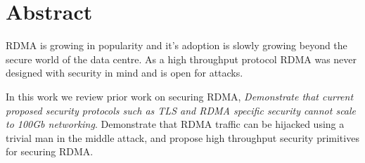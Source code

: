 \section{Abstract}
\label{sec:abstract}

RDMA is growing in popularity and it's adoption is slowly growing beyond the
secure world of the data centre. As a high throughput protocol RDMA was never
designed with security in mind and is open for attacks.

In this work we review prior work on securing RDMA, \emph{Demonstrate that
current proposed security protocols such as TLS and RDMA specific security cannot
scale to 100Gb networking}. Demonstrate that RDMA traffic can be hijacked using
a trivial man in the middle attack, and propose high throughput security
primitives for securing RDMA.
